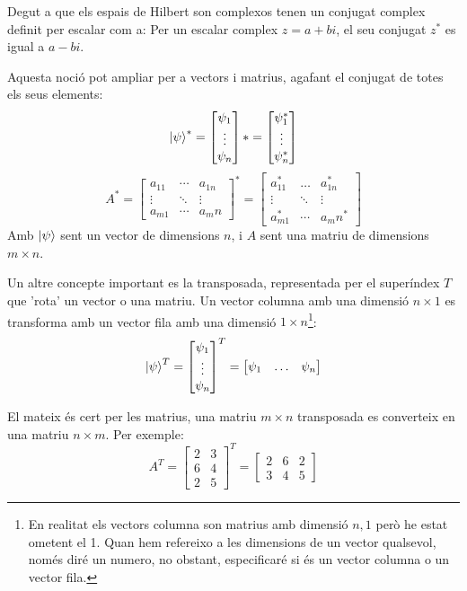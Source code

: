 Degut a que els espais de Hilbert son complexos tenen un conjugat complex definit per escalar com a: Per un escalar complex $z=a +bi$, el seu conjugat $z^*$ es igual a $a-bi$. 

Aquesta noció pot ampliar per a vectors i matrius, agafant el conjugat de totes els seus elements:
$$
\ket{\psi}^{*} = 
	\begin{bmatrix} \psi_{1} \\ \vdots \\ \psi_{n} \end{bmatrix}* = \begin{bmatrix} \psi_{1}^* \\ \vdots \\ \psi_{n}^* \end{bmatrix}
$$
$$
A^{*} = 
	\begin{bmatrix} 
	a_{11} & \cdots & a_{1n}\\ 
	\vdots & \ddots & \vdots \\ 
	a_{m1} & \cdots & a_mn
\end{bmatrix}^* 
= \begin{bmatrix} 
	a_{11}^* & \dots & a_{1n}^*\\ 
	\vdots & \ddots & \vdots \\ 
	a_{m1}^* & \cdots & a_mn^*
\end{bmatrix}
$$
Amb $\ket{\psi}$ sent un vector de dimensions $n$, i $A$ sent una matriu de dimensions $m \times n$.

Un altre concepte important es la transposada, representada per el superíndex $T$ que 'rota' un vector o una matriu. Un vector columna amb una dimensió $n\times 1$ es transforma amb un vector fila amb una dimensió $1\times n$\footnote{En realitat els vectors columna son matrius amb dimensió $n,1$ però he estat ometent el 1. Quan hem refereixo a les dimensions de un vector qualsevol, només diré un numero, no obstant, especificaré si és un vector columna o un vector fila.}:
$$
\ket{\psi}^{T} = 
	\begin{bmatrix} \psi_{1} \\ \vdots \\ \psi_{n} \end{bmatrix}^T = \begin{bmatrix} \psi_{1} & \dots & \psi_{n} \end{bmatrix}
$$

El mateix és cert per les matrius, una matriu $m\times n$ transposada es converteix en una matriu $n \times m$. Per exemple:
$$
A^T = \begin{bmatrix}
	 2 & 3 \\
	 6 & 4 \\
	 2 & 5 
\end{bmatrix}^T = \begin{bmatrix}
 2 & 6 & 2 \\
 3 & 4 & 5
\end{bmatrix}
$$

